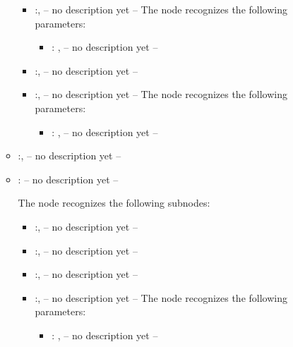 \begin{itemize}
\begin{itemize}
\begin{itemize}
            \item {}:, 
              -- no description yet --
              The  node recognizes the following parameters:
                \begin{itemize}
                  \item {}: , 
                    -- no description yet --
              \end{itemize}

            \item {}:, 
              -- no description yet --

            \item {}:, 
              -- no description yet --
              The  node recognizes the following parameters:
                \begin{itemize}
                  \item {}: , 
                    -- no description yet --
              \end{itemize}
          \end{itemize}

        \item {}:, 
          -- no description yet --

        \item {}:
          -- no description yet --

          The  node recognizes the following subnodes:
          \begin{itemize}
            \item {}:, 
              -- no description yet --

            \item {}:, 
              -- no description yet --

            \item {}:, 
              -- no description yet --

            \item {}:, 
              -- no description yet --
              The  node recognizes the following parameters:
                \begin{itemize}
                  \item {}: , 
                    -- no description yet --
              \end{itemize}


\end{itemize}
\end{itemize}
\end{itemize}
